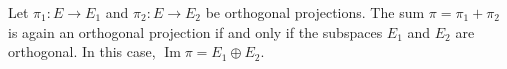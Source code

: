 Let $\pi_1: E \rightarrow E_1$ and $\pi_2: E \rightarrow E_2$ be orthogonal projections. The sum $\pi = \pi_1 + \pi_2$ is again an orthogonal projection if and only if the subspaces $E_1$ and $E_2$ are orthogonal. In this case, $\operatorname{Im} \pi = E_1 \oplus E_2$.

